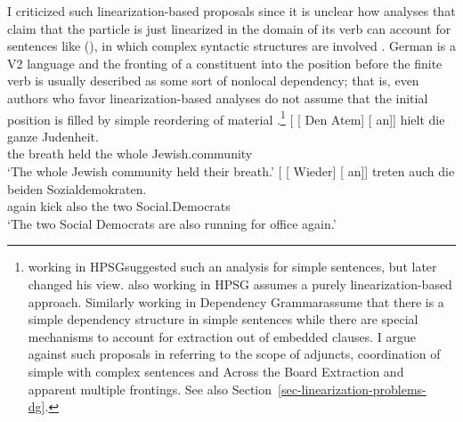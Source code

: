 \begin{exe}
\begin{xlist}[iv.]
\begin{exe}
\begin{xlist}[iv.]
I criticized such linearization-based proposals since it is unclear how
analyses that claim that the particle is just linearized in the domain of its verb can account for
sentences like (), in which complex syntactic structures are involved \citep{Mueller2007d}. German is a V2 language
and the fronting of a constituent into the position before the finite verb is usually described as
some sort of nonlocal dependency; that is, even authors who favor linearization-based analyses do
not assume that the initial position is filled by simple reordering of material
\citep{Kathol2000a,Mueller99a,Mueller2002b,TBjerre2006a}.\footnote{
  \citet[Section~6.3]{Kathol95a} working in HPSG\indexhpsg suggested such an analysis for simple sentences, but later
  changed his view. \citet{Wetta2011a} also working in HPSG assumes a purely linearization-based
  approach. Similarly \citet{GO2009a} working in  Dependency Grammar\indexdg assume that there is a
  simple dependency structure in simple sentences while there are special mechanisms to account for
  extraction out of embedded clauses. I argue against such proposals in  referring
  to the scope of adjuncts, coordination of simple with complex sentences and Across the Board
  Extraction and apparent multiple frontings. See also Section~\ref{sec-linearization-problems-dg}.
}
\eal
\label{ex-complex-vf}
\ex
\gll {}[ [ Den Atem]  [ an]] hielt die ganze Judenheit.\footnotemark\\
       {}        {}        the breath {}    \partic{}  held  the whole Jewish.community\\
\glt `The whole Jewish community held their breath.'
\ex\label{bsp-wieder-an-tritt-zwei}
\gll {}[ [ Wieder] [ an]] treten auch die beiden Sozialdemokraten.\footnotemark\\
      {}         {}        again   {}        \partic{} kick also the two Social.Democrats\\
\glt `The two Social Democrats are also running for office again.' %


\end{xlist}
\end{exe}
\end{xlist}
\end{exe}
